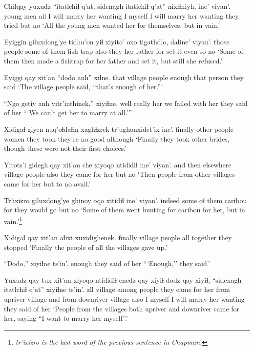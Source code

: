 \documentclass[12pt]{article}
\begin{document}
\gll Chilqay yuxudz ``itatlchiɬ  q'at,  sidenagh itatlchiɬ q'at''  nixiɬniyh, ine' viyan'.
{young men} all  {I will marry her} wanting {I myself} {I will marry her} wanting {they tried} but no
\glt `All the young men wanted her for themselves, but in vain.'
\glend

\gll Eyiggin giluxdong'ye tidhu'on yiɬ xiyito'  oxo tigathdlo, daɬine' viyan'.
{those people} {some of them} {fish trap} also {they her father} for {set it} {even so} no
\glt `Some of them then made a fishtrap for her father and set it, but still she refused.'
\glend

\gll Eyiggi qay  xit'an  ``dodo  anh'' xiɬne.
that village  people  enough  {that person} {they said}
\glt `The village people said, ``that's enough of her.'''
\glend

\gll ``Ngo getiy anh vitr'inthinek,'' xiyiɬne.
well really her {we failed with her} {they said of her}
\glt ```We can't get her to marry at all.'''
\glend

\gll Xidigaɬ giyen  nuq'oɬdaɬin xaghɬzrek tr'ughonxidet'ix ine'.
finally  {other people} women {they took} {they're no good} although
\glt `Finally they took other brides, though these were not their first choices.' 
\glend

\gll Yitots'i gidegh  qay xit'an che {xiyoqo ntididiɬ} ine' viyan'.
{and then} elsewhere village people also {they came for her} but no
\glt `Then people from other villages came for her but to no avail.'
\glend

\gll Tr'ixizro giluxdong'ye ghinoy  oqo xitidiɬ  ine' viyan'.
indeed  {some of them} caribou  for {they would go} but no
\glt `Some of them went hunting for caribou for her, but in vain.'\footnote{\em tr'ixizro \em is the last word of the previous sentence in Chapman.}
\glend

\gll Xidigaɬ qay  xit'an  aɬixi  xuxidighenek.
finally  village  people  {all together} {they stopped}
\glt `Finally the people of all the villages gave up.' 
\glend

\gll ``Dodo,'' xiyiɬne ts'in'.
enough {they said of her }
\glt ```Enough,'' they said.'
\glend

\gll Yuxudz qay tux xit'an  {xiyoqo ntididiɬ} enedz qay xiyiɬ dodz  qay xiyiɬ, ``sidenagh itatlchiɬ  q'at'' xiyiɬne ts'in'. 
all  village among people  {they came for her} {from upriver} village and  {from downriver} village also {I myself} {I will marry her} wanting {they said of her}
\glt `People from the villages both upriver and downriver came for her, saying ``I want to marry her myself''.' 
\glend
\end{document}
